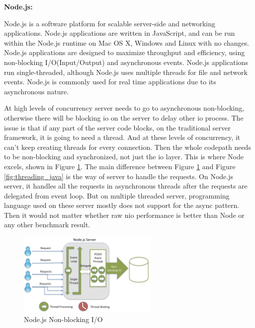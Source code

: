 \textbf{Node.js:}

\par Node.js is a software platform for scalable server-side and networking applications. Node.js applications are written in JavaScript, and can be run within the Node.js runtime on Mac OS X, Windows and Linux with no changes. Node.js applications are designed to maximize throughput and efficiency, using non-blocking I/O(Input/Output) and asynchronous events. Node.js applications run single-threaded, although Node.js uses multiple threads for file and network events. Node.js is commonly used for real time applications due to its asynchronous nature.\cite{wiki:nodejs}

\par At high levels of concurrency server needs to go to asynchronous non-blocking, otherwise there will be blocking \gls{io} on the server to delay other \gls{io} process. The issue is that if any part of the server code blocks, on the traditional server framework,  it is going to need a thread. And at these levels of concurrency, it can’t keep creating threads for every connection. Then the whole codepath needs to be non-blocking and synchronized, not just the \gls{io} layer. This is where Node excels, shown in Figure \ref{fig:nodejs}. The main difference between Figure \ref{fig:nodejs} and Figure \ref{fig:threading_java} is the way of server to handle the requests. On Node.js server, it handles all the requests in asynchronous threads after the requests are delegated from event loop. But on multiple threaded server, programming language used on these server mostly does not support for the async pattern. Then it would not matter whether raw \gls{nio} performance is better than Node or any other benchmark result.

\begin{figure}
	\centering
    	\includegraphics[width=0.60\textwidth,natwidth=610,natheight=642]{figs/nodejs.png}
  	\caption{Node.js Non-blocking I/O\cite{strongloop:nodejs}}
  	\label{fig:nodejs}
\end{figure}

